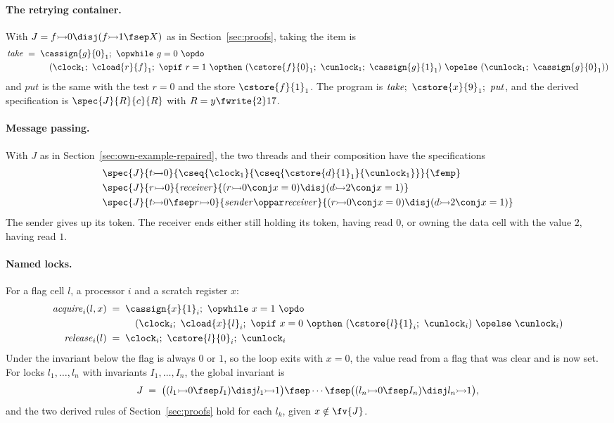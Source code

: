 \paragraph{The retrying container.}
With $J = f \fcell 0 \disj (f \fcell 1 \fsep X)$ as in
Section~\ref{sec:proofs}, taking the item is
\begin{align*}
\mathit{take} \;=\;\;
 & \cassign{g}{0}_1;\ \opwhile\ g = 0\ \opdo \\
 & \quad (\clock_1;\ \cload{r}{f}_1;\
     \opif\ r = 1\ \opthen\ (\cstore{f}{0}_1;\ \cunlock_1;\ \cassign{g}{1}_1)\
     \opelse\ (\cunlock_1;\ \cassign{g}{0}_1))
\end{align*}
and $\mathit{put}$ is the same with the test $r = 0$ and the store
$\cstore{f}{1}_1$. The program is
$\mathit{take};\ \cstore{x}{9}_1;\ \mathit{put}$, and the derived
specification is $\spec{J}{R}{c}{R}$ with $R = y \fwrite{2} 17$.

\paragraph{Message passing.}
With $J$ as in Section~\ref{sec:own-example-repaired}, the two threads and
their composition have the specifications
\begin{align*}
 & \spec{J}{t \fcell 0}
    {\cseq{\clock_1}{\cseq{\cstore{d}{1}_1}{\cunlock_1}}}{\femp} \\
 & \spec{J}{r \fcell 0}{\mathit{receiver}}
    {(r \fcell 0 \conj x = 0) \disj (d \fcell 2 \conj x = 1)} \\
 & \spec{J}{t \fcell 0 \fsep r \fcell 0}{\mathit{sender} \oppar
    \mathit{receiver}}
    {(r \fcell 0 \conj x = 0) \disj (d \fcell 2 \conj x = 1)}
\end{align*}
The sender gives up its token. The receiver
ends either still holding its token, having read $0$, or owning the data
cell with the value $2$, having read $1$.

\paragraph{Named locks.}
For a flag cell $l$, a processor $i$ and a scratch register $x$:
\begin{align*}
\mathit{acquire}_i(l,x) \;=\;\;
 & \cassign{x}{1}_i;\ \opwhile\ x = 1\ \opdo \\
 & \quad (\clock_i;\ \cload{x}{l}_i;\
     \opif\ x = 0\ \opthen\ (\cstore{l}{1}_i;\ \cunlock_i)\
     \opelse\ \cunlock_i) \\
\mathit{release}_i(l) \;=\;\;
 & \clock_i;\ \cstore{l}{0}_i;\ \cunlock_i
\end{align*}
Under the invariant below the flag is always $0$ or $1$, so the loop exits
with $x = 0$, the value read from a flag that was clear and is now set. For locks $l_1,\dots,l_n$ with invariants $I_1,\dots,I_n$, the
global invariant is
\[
  J \;=\; \bigl((l_1 \fcell 0 \fsep I_1) \disj l_1 \fcell 1\bigr) \fsep
          \cdots \fsep
          \bigl((l_n \fcell 0 \fsep I_n) \disj l_n \fcell 1\bigr),
\]
and the two derived rules of Section~\ref{sec:proofs} hold for each $l_k$,
given $x \notin \fv{J}$.

